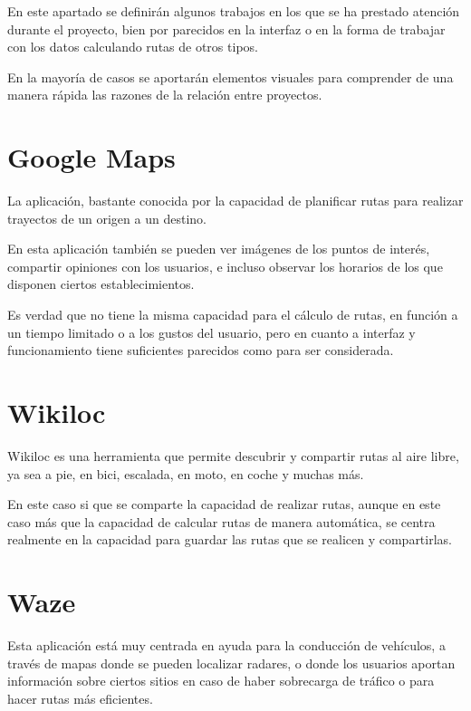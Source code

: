 
En este apartado se definirán algunos trabajos en los que se ha prestado atención durante el proyecto, bien por parecidos en la interfaz o en la forma de trabajar con los datos calculando rutas de otros tipos.

En la mayoría de casos se aportarán elementos visuales para comprender de una manera rápida las razones de la relación entre proyectos.


\section{Google Maps}

La aplicación, bastante conocida por la capacidad de planificar rutas para realizar trayectos de un origen a un destino. \cite{maps}

En esta aplicación también se pueden ver imágenes de los puntos de interés, compartir opiniones con los usuarios, e incluso observar los horarios de los que disponen ciertos establecimientos. 

Es verdad que no tiene la misma capacidad para el cálculo de rutas, en función a un tiempo limitado o a los gustos del usuario, pero en cuanto a interfaz y funcionamiento tiene suficientes parecidos como para ser considerada.


\section{Wikiloc}

Wikiloc es una herramienta que permite descubrir y compartir rutas al aire libre, ya sea a pie, en bici, escalada, en moto, en coche y muchas más. \cite{wikiloc}

En este caso si que se comparte la capacidad de realizar rutas, aunque en este caso más que la capacidad de calcular rutas de manera automática, se centra realmente en la capacidad para guardar las rutas que se realicen y compartirlas.


\section{Waze}

Esta aplicación está muy centrada en ayuda para la conducción de vehículos, a través de mapas donde se pueden localizar radares, o donde los usuarios aportan información sobre ciertos sitios en caso de haber sobrecarga de tráfico o para hacer rutas más eficientes. \cite{waze}


